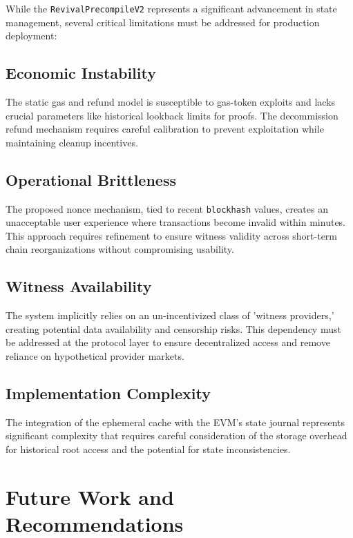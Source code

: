 \documentclass{article}
\begin{document}
While the \texttt{RevivalPrecompileV2} represents a significant advancement in state management, several critical limitations must be addressed for production deployment:

\subsection{Economic Instability}

The static gas and refund model is susceptible to gas-token exploits and lacks crucial parameters like historical lookback limits for proofs. The decommission refund mechanism requires careful calibration to prevent exploitation while maintaining cleanup incentives.

\subsection{Operational Brittleness}

The proposed nonce mechanism, tied to recent \texttt{blockhash} values, creates an unacceptable user experience where transactions become invalid within minutes. This approach requires refinement to ensure witness validity across short-term chain reorganizations without compromising usability.

\subsection{Witness Availability}

The system implicitly relies on an un-incentivized class of 'witness providers,' creating potential data availability and censorship risks. This dependency must be addressed at the protocol layer to ensure decentralized access and remove reliance on hypothetical provider markets.

\subsection{Implementation Complexity}

The integration of the ephemeral cache with the EVM's state journal represents significant complexity that requires careful consideration of the storage overhead for historical root access and the potential for state inconsistencies.

\section{Future Work and Recommendations}
\end{document}
